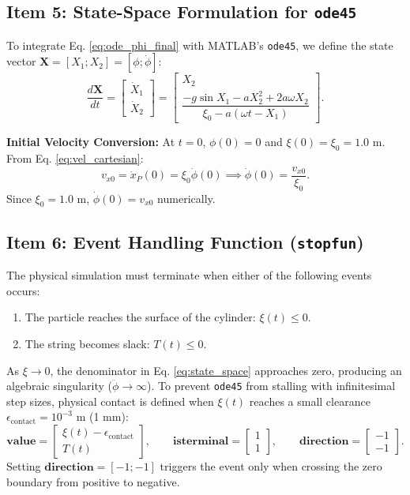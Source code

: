 \documentclass[11pt,a4paper]{article}
\begin{document}
\subsection{Item 5: State-Space Formulation for \texttt{ode45}}
To integrate Eq. \eqref{eq:ode_phi_final} with MATLAB's \texttt{ode45}, we define the state vector $\mathbf{X} = [X_1; X_2] = [\phi; \dot{\phi}]$:
\begin{equation}
    \label{eq:state_space}
    \frac{d\mathbf{X}}{dt} = \begin{bmatrix} \dot{X}_1 \\ \dot{X}_2 \end{bmatrix} = \begin{bmatrix} X_2 \\ \dfrac{-g\sin X_1 - aX_2^2 + 2a\omega X_2}{\xi_0 - a(\omega t - X_1)} \end{bmatrix}.
\end{equation}

\noindent\textbf{Initial Velocity Conversion:} At $t = 0$, $\phi(0) = 0$ and $\xi(0) = \xi_0 = 1.0\text{ m}$. From Eq. \eqref{eq:vel_cartesian}:
\begin{equation}
    v_{x0} = \dot{x}_P(0) = \xi_0\dot{\phi}(0) \implies \dot{\phi}(0) = \frac{v_{x0}}{\xi_0}.
\end{equation}
Since $\xi_0 = 1.0\text{ m}$, $\dot{\phi}(0) = v_{x0}$ numerically.

\subsection{Item 6: Event Handling Function (\texttt{stopfun})}
The physical simulation must terminate when either of the following events occurs:
\begin{enumerate}
    \item The particle reaches the surface of the cylinder: $\xi(t) \le 0$.
    \item The string becomes slack: $T(t) \le 0$.
\end{enumerate}
As $\xi \to 0$, the denominator in Eq. \eqref{eq:state_space} approaches zero, producing an algebraic singularity ($\ddot{\phi} \to \infty$). To prevent \texttt{ode45} from stalling with infinitesimal step sizes, physical contact is defined when $\xi(t)$ reaches a small clearance $\epsilon_{\text{contact}} = 10^{-3}\text{ m}$ (1 mm):
\begin{equation}
    \mathbf{value} = \begin{bmatrix} \xi(t) - \epsilon_{\text{contact}} \\ T(t) \end{bmatrix}, \qquad \mathbf{isterminal} = \begin{bmatrix} 1 \\ 1 \end{bmatrix}, \qquad \mathbf{direction} = \begin{bmatrix} -1 \\ -1 \end{bmatrix}.
\end{equation}
Setting $\mathbf{direction} = [-1; -1]$ triggers the event only when crossing the zero boundary from positive to negative.
\end{document}
